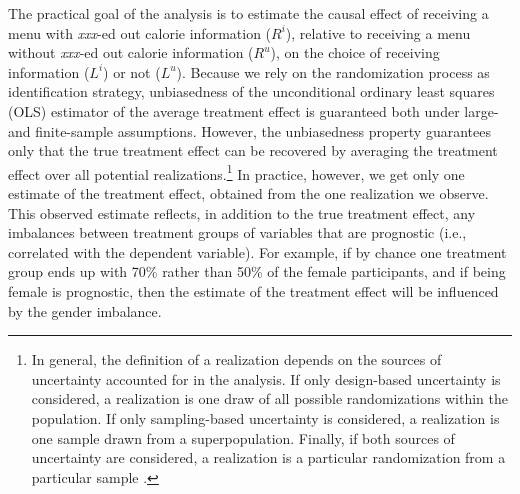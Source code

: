 \documentclass[12pt]{article}
\begin{document}
The practical goal of the analysis is to estimate the causal effect of receiving a menu with \emph{xxx}-ed out calorie information ($R^i$), relative to receiving a menu without \emph{xxx}-ed out calorie information ($R^u$), on the choice of receiving information ($L^i$) or not ($L^u$). Because we rely on the randomization process as identification strategy, unbiasedness of the unconditional ordinary least squares (OLS) estimator of the average treatment effect is guaranteed both under large- and finite-sample assumptions. However, the unbiasedness property guarantees only that the true treatment effect can be recovered by averaging the treatment effect over all potential realizations.\footnote{In general, the definition of a realization depends on the sources of uncertainty accounted for in the analysis. If only design-based uncertainty is considered, a realization is one draw of all possible randomizations within the population. If only sampling-based uncertainty is considered, a realization is one sample drawn from a superpopulation. Finally, if both sources of uncertainty are considered, a realization is a particular randomization from a particular sample \citet{abadieSamplingBasedDesignBasedUncertainty2020}.} In practice, however, we get only one estimate of the treatment effect, obtained from the one realization we observe. This observed estimate reflects, in addition to the true treatment effect, any imbalances between treatment groups of variables that are prognostic (i.e., correlated with the dependent variable). For example, if by chance one treatment group ends up with 70\% rather than 50\% of the female participants, and if being female is prognostic, then the estimate of the treatment effect will be influenced by the gender imbalance.
\end{document}
